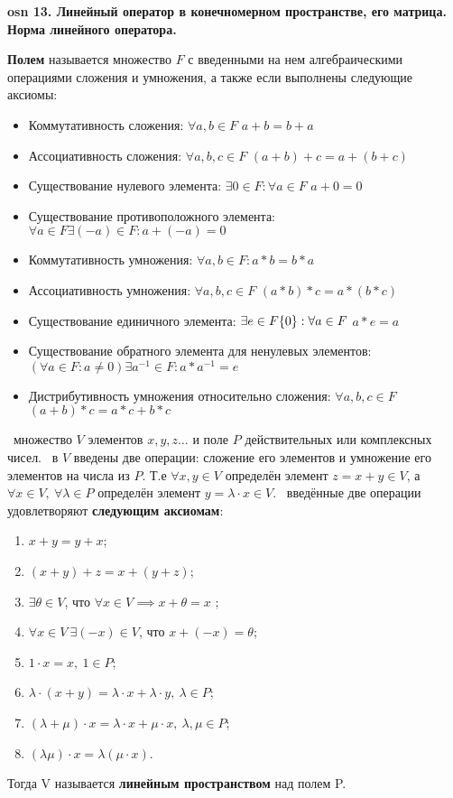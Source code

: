 \setcounter{section}{15}
\setcounter{subsection}{13}
\setcounter{equation}{0}
\textbf{\LARGE osn 13. Линейный оператор в конечномерном пространстве, его матрица. Норма линейного оператора.}


\textbf{Полем} называется множество $F$ с введенными на нем алгебраическими операциями сложения и умножения, а также если выполнены следующие аксиомы:
\begin{itemize}
    \item Коммутативность сложения: $\forall a,b \in F$ $a + b = b + a$
    \item Ассоциативность сложения: $\forall a,b,c \in F$ $(a + b) + c = a + (b + c)$
    \item Существование нулевого элемента: $\exists 0 \in F: \forall a \in F$ $a + 0 = 0$
    \item Существование противоположного элемента: $\forall a \in F \exists (-a) \in F: a + (-a) = 0$
    \item Коммутативность умножения: $\forall a, b \in F: a * b = b * a$
    \item Ассоциативность умножения: $\forall a,b,c \in F$ $(a * b) * c = a * (b * c)$
    \item Существование единичного элемента: $\exists e \in F\\ \{0\}: \forall a \in F$ $a * e = a$ 
    \item Существование обратного элемента для ненулевых элементов: $ (\forall a \in F: a \neq 0) \exists a^{-1} \in F: a * a^{-1} = e$
    \item Дистрибутивность умножения относительно сложения: $\forall a,b,c \in F$ $(a + b) *c = a * c + b * c$
\end{itemize}


\faEye \ множество $V$ элементов $x, y, z\dots$ и поле $P$ действительных или комплексных чисел. \mathLet \ в $V$ введены две операции: сложение его элементов и умножение его элементов на числа из $P$. 
Т.е $\forall x,y \in V$ определён элемент $z = x+y \in V$, а $\forall x \in V, ~ \forall \lambda \in P$ определён элемент $y = \lambda \cdot x \in  V$. \mathLet \ введённые две операции удовлетворяют \textbf{следующим аксиомам}:
\begin{enumerate}
    \item $x+y=y+x$;
    \item $(x+y)+z=x+(y+z)$;
    \item $\exists \theta\in V$, что $\forall x\in V \implies x+\theta=x$ ;
    \item $\forall x \in V ~ \exists (-x) \in V$, что $x + (-x) = \theta$;
    \item $1 \cdot x = x,~1 \in P$;
    \item $\lambda \cdot(x+y)=\lambda \cdot x+\lambda \cdot y,~\lambda \in P$;
    \item $(\lambda +\mu)\cdot x=\lambda \cdot x+\mu \cdot x,~\lambda,\mu \in P$;
    \item $(\lambda \mu )\cdot x = \lambda (\mu \cdot x)$.
\end{enumerate}
Тогда V называется \textbf{линейным пространством} над полем P.

